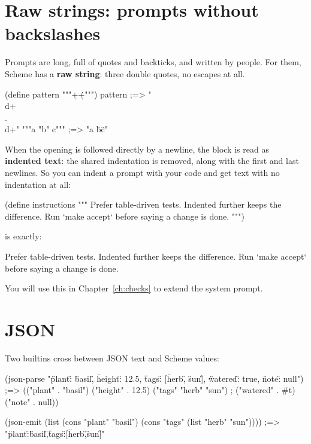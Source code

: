 \section{Raw strings: prompts without backslashes}

Prompts are long, full of quotes and backticks, and written by people. For
them, \nodwyn{} Scheme has a \textbf{raw string}: three double quotes, no
escapes at all.

\begin{scm}
(define pattern """\d+\.\d+""")
pattern                              ;=> "\\d+\\.\\d+"
"""a "b" c"""                        ;=> "a \"b\" c"
\end{scm}

When the opening  is followed directly by a newline, the block is
read as \textbf{indented text}: the shared indentation is removed, along
with the first and last newlines. So you can indent a prompt with your code
and get text with no indentation at all:

\begin{scm}
(define instructions
  """
  Prefer table-driven tests.
    Indented further keeps the difference.
  Run `make accept` before saying a change is done.
  """)
\end{scm}

 is exactly:

\begin{txt}
Prefer table-driven tests.
  Indented further keeps the difference.
Run `make accept` before saying a change is done.
\end{txt}

You will use this in Chapter~\ref{ch:checks} to extend the system prompt.

\section{JSON}

Two builtins cross between JSON text and Scheme values:

\begin{scm}
(json-parse "{\"plant\": \"basil\", \"height\": 12.5,
              \"tags\": [\"herb\", \"sun\"], \"watered\": true, \"note\": null}")
;=> (("plant" . "basil") ("height" . 12.5) ("tags" "herb" "sun")
;    ("watered" . #t) ("note" . null))

(json-emit (list (cons "plant" "basil")
                 (cons "tags" (list "herb" "sun"))))
;=> "{\"plant\":\"basil\",\"tags\":[\"herb\",\"sun\"]}"
\end{scm}

